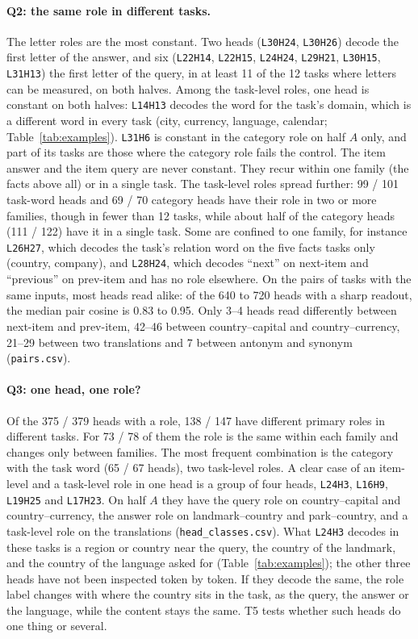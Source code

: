 \documentclass[10pt,a4paper]{article}
\newcommand{\hd}[1]{\texttt{#1}}
\begin{document}
\paragraph{Q2: the same role in different tasks.} The letter roles are the most constant. Two heads (\hd{L30H24}, \hd{L30H26}) decode the first letter of the answer, and six (\hd{L22H14}, \hd{L22H15}, \hd{L24H24}, \hd{L29H21}, \hd{L30H15}, \hd{L31H13}) the first letter of the query, in at least 11 of the 12 tasks where letters can be measured, on both halves. Among the task-level roles, one head is constant on both halves: \hd{L14H13} decodes the word for the task's domain, which is a different word in every task (city, currency, language, calendar; Table~\ref{tab:examples}). \hd{L31H6} is constant in the category role on half $A$ only, and part of its tasks are those where the category role fails the control. The item answer and the item query are never constant. They recur within one family (the facts above all) or in a single task. The task-level roles spread further: 99 / 101 task-word heads and 69 / 70 category heads have their role in two or more families, though in fewer than 12 tasks, while about half of the category heads (111 / 122) have it in a single task. Some are confined to one family, for instance \hd{L26H27}, which decodes the task's relation word on the five facts tasks only (country, company), and \hd{L28H24}, which decodes ``next'' on next-item and ``previous'' on prev-item and has no role elsewhere. On the pairs of tasks with the same inputs, most heads read alike: of the 640 to 720 heads with a sharp readout, the median pair cosine is 0.83 to 0.95. Only 3--4 heads read differently between next-item and prev-item, 42--46 between country--capital and country--currency, 21--29 between two translations and 7 between antonym and synonym (\texttt{pairs.csv}).

\paragraph{Q3: one head, one role?} Of the 375 / 379 heads with a role, 138 / 147 have different primary roles in different tasks. For 73 / 78 of them the role is the same within each family and changes only between families. The most frequent combination is the category with the task word (65 / 67 heads), two task-level roles. A clear case of an item-level and a task-level role in one head is a group of four heads, \hd{L24H3}, \hd{L16H9}, \hd{L19H25} and \hd{L17H23}. On half $A$ they have the query role on country--capital and country--currency, the answer role on landmark--country and park--country, and a task-level role on the translations (\texttt{head\_classes.csv}). What \hd{L24H3} decodes in these tasks is a region or country near the query, the country of the landmark, and the country of the language asked for (Table~\ref{tab:examples}); the other three heads have not been inspected token by token. If they decode the same, the role label changes with where the country sits in the task, as the query, the answer or the language, while the content stays the same. T5 tests whether such heads do one thing or several.
\end{document}
